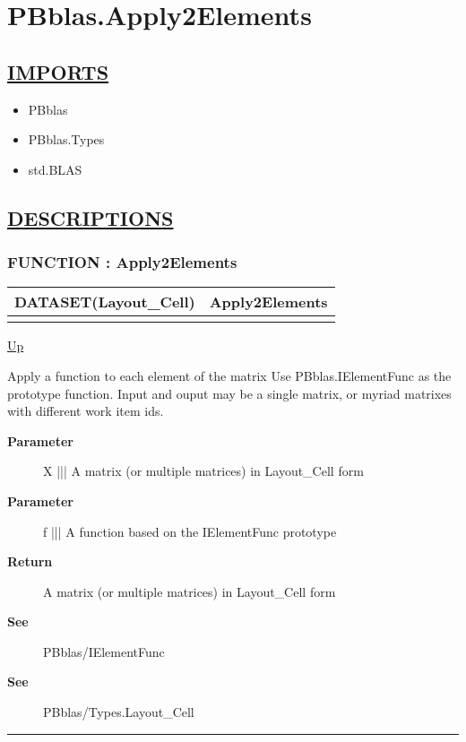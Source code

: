 \chapter*{PBblas.Apply2Elements}
\hypertarget{ecldoc:toc:PBblas.Apply2Elements}{}

\section*{\underline{IMPORTS}}
\begin{itemize}
\item PBblas
\item PBblas.Types
\item std.BLAS
\end{itemize}

\section*{\underline{DESCRIPTIONS}}
\subsection*{FUNCTION : Apply2Elements}
\hypertarget{ecldoc:pbblas.apply2elements}{}

{\renewcommand{\arraystretch}{1.5}
\begin{tabularx}{\textwidth}{|>{\raggedright\arraybackslash}l|X|}
\hline
\hspace{0pt}DATASET(Layout\_Cell) & Apply2Elements \\
\hline
\multicolumn{2}{|>{\raggedright\arraybackslash}X|}{\hspace{0pt}(DATASET(Layout\_Cell) X, IElementFunc f)} \\
\hline
\end{tabularx}
}

\hyperlink{ecldoc:toc:PBblas}{Up}

\par
Apply a function to each element of the matrix Use PBblas.IElementFunc as the prototype function. Input and ouput may be a single matrix, or myriad matrixes with different work item ids.

\par
\begin{description}
\item [\textbf{Parameter}] X ||| A matrix (or multiple matrices) in Layout\_Cell form
\item [\textbf{Parameter}] f ||| A function based on the IElementFunc prototype
\item [\textbf{Return}] A matrix (or multiple matrices) in Layout\_Cell form
\item [\textbf{See}] PBblas/IElementFunc
\item [\textbf{See}] PBblas/Types.Layout\_Cell
\end{description}

\rule{\textwidth}{0.4pt}
